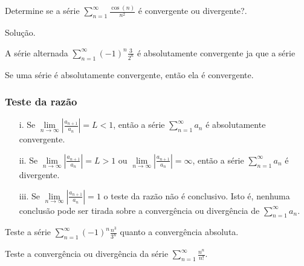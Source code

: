 \vspace*{5cm}
\begin{ex}
Determine se a série $\sum_{n=1}^{\infty}\frac{\cos (n)}{n^{2}}$ é convergente ou divergente?.
	
	Solução.
\end{ex}
\vspace*{5cm}
\begin{ex}
	A série alternada $\sum_{n=1}^{\infty}(-1)^{n}\frac{3}{2^{n}}$ é absolutamente convergente ja que a série
\end{ex}
\vspace*{5cm}
\begin{teo} 
	Se uma série é absolutamente convergente, então ela é convergente.
\end{teo}
\subsubsection{Teste da razão} 
\begin{itemize}
	\item[i.]Se $\lim\limits_{n\rightarrow\infty} \left| \frac{a_{n+1}}{a_{n}}\right|=L<1$, então a série $\sum_{n=1}^{\infty}a_{n}$ é absolutamente convergente.
	\item[ii.]Se $\lim\limits_{n\rightarrow\infty} \left| \frac{a_{n+1}}{a_{n}}\right|=L>1$ ou $\lim\limits_{n\rightarrow\infty} \left| \frac{a_{n+1}}{a_{n}}\right|=\infty$, então a série $\sum_{n=1}^{\infty}a_{n}$ é divergente.
	\item[iii.]Se $\lim\limits_{n\rightarrow\infty} \left| \frac{a_{n+1}}{a_{n}}\right|=1$ o teste da razão não é conclusivo. Isto é, nenhuma conclusão pode ser tirada sobre a convergência ou divergência de $\sum_{n=1}^{\infty}a_{n}$. 
\end{itemize} 
\begin{ex}
	Teste a série $\sum_{n=1}^{\infty}(-1)^{n}\frac{n^{3}}{3^{n}}$ quanto a convergência absoluta. 
\end{ex}
\vspace*{5cm}
\begin{ex}
	Teste a convergência ou divergência da série $\sum_{n=1}^{\infty}\frac{n^{n}}{n!}$. 
\end{ex}
\vspace*{5cm}
